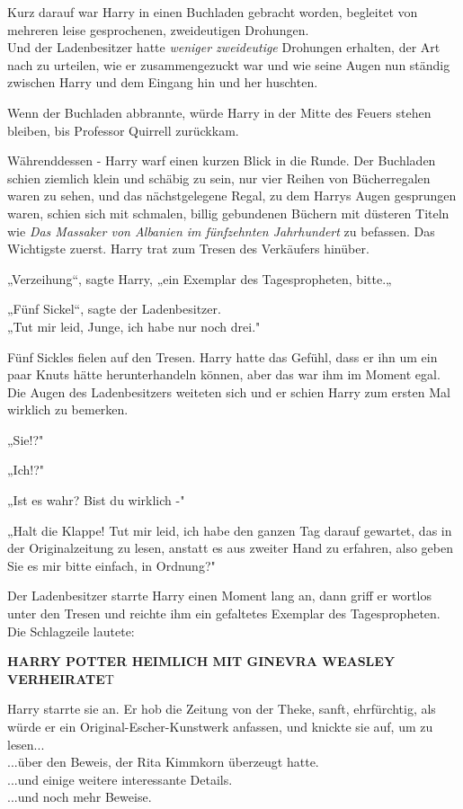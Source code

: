 {Kurz darauf war Harry in einen Buchladen gebracht worden, begleitet von mehreren leise gesprochenen, zweideutigen Drohungen.\\ Und der Ladenbesitzer hatte \emph{weniger zweideutige} Drohungen erhalten, der Art nach zu urteilen, wie er zusammengezuckt war und wie seine Augen nun ständig zwischen Harry und dem Eingang hin und her huschten.

Wenn der Buchladen abbrannte, würde Harry in der Mitte des Feuers stehen bleiben, bis Professor Quirrell zurückkam.

Währenddessen - Harry warf einen kurzen Blick in die Runde. Der Buchladen schien ziemlich klein und schäbig zu sein, nur vier Reihen von Bücherregalen waren zu sehen, und das nächstgelegene Regal, zu dem Harrys Augen gesprungen waren, schien sich mit schmalen, billig gebundenen Büchern mit düsteren Titeln wie \emph{Das Massaker von Albanien im fünfzehnten Jahrhundert} zu befassen. Das Wichtigste zuerst. Harry trat zum Tresen des Verkäufers hinüber.

„Verzeihung“, sagte Harry, „ein Exemplar des Tagespropheten, bitte.„

„Fünf Sickel“, sagte der Ladenbesitzer.\\ „Tut mir leid, Junge, ich habe nur noch drei."

Fünf Sickles fielen auf den Tresen. Harry hatte das Gefühl, dass er ihn um ein paar Knuts hätte herunterhandeln können, aber das war ihm im Moment egal.\\ Die Augen des Ladenbesitzers weiteten sich und er schien Harry zum ersten Mal wirklich zu bemerken.

„Sie!?"

„Ich!?"

„Ist es wahr? Bist du wirklich -"

„Halt die Klappe! Tut mir leid, ich habe den ganzen Tag darauf gewartet, das in der Originalzeitung zu lesen, anstatt es aus zweiter Hand zu erfahren, also geben Sie es mir bitte einfach, in Ordnung?"

Der Ladenbesitzer starrte Harry einen Moment lang an, dann griff er wortlos unter den Tresen und reichte ihm ein gefaltetes Exemplar des Tagespropheten. Die Schlagzeile lautete:

\textbf{HARRY POTTER HEIMLICH MIT GINEVRA WEASLEY VERHEIRATE}T

Harry starrte sie an. Er hob die Zeitung von der Theke, sanft, ehrfürchtig, als würde er ein Original-Escher-Kunstwerk anfassen, und knickte sie auf, um zu lesen...\\ ...über den Beweis, der Rita Kimmkorn überzeugt hatte.\\ ...und einige weitere interessante Details.\\ ...und noch mehr Beweise.

}
